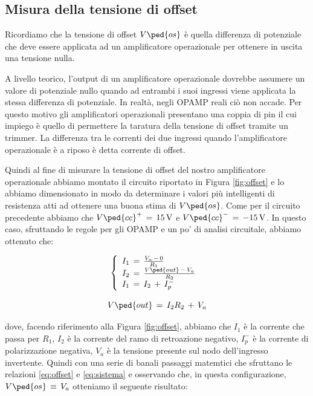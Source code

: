 \subsection*{Misura della tensione di offset}

Ricordiamo che la tensione di offset $V\ped{os}$ è quella differenza di potenziale che deve essere applicata ad un amplificatore operazionale per ottenere in uscita una tensione nulla.

A livello teorico, l'output di un amplificatore operazionale dovrebbe assumere un valore di potenziale nullo quando ad entrambi i suoi ingressi viene applicata la stessa differenza di potenziale. In realtà, negli OPAMP reali ciò non accade. Per questo motivo gli amplificatori operazionali presentano una coppia di pin il cui impiego è quello di permettere la taratura della tensione di offset tramite un trimmer. La differenza tra le correnti dei due ingressi quando l'amplificatore operazionale è a riposo è detta corrente di offset.

Quindi al fine di misurare la tensione di offset del nostro amplificatore operazionale abbiamo montato il circuito riportato in Figura \ref{fig:offset} e lo abbiamo dimensionato in modo da determinare i valori più intelligenti di resistenza atti ad ottenere una buona stima di $V\ped{os}$.
Come per il circuito precedente abbiamo che $V\ped{cc}^+\,=\,\SI{+15}{\volt}$ e $V\ped{cc}^-\,=\,\SI{-15}{\volt}$.
In questo caso, sfruttando le regole per gli OPAMP e un po' di analisi circuitale, abbiamo ottenuto che:

\begin{equation}
	\left\{
  \begin{array}{l l l}
    I_1\,=\,\frac{V_a\,-\,0}{R_1}\\
    I_2\,=\,\frac{V\ped{out}\,-\,V_a}{R_2}\\
    I_1\,=\,I_2\,+\,I_{p}^-
  \end{array} \right.\
  \label{eq:sistema}
\end{equation}

\begin{equation}
	V\ped{out}\,=\,I_2R_2\,+\,V_a
	\label{eq:offset}
\end{equation}

dove, facendo riferimento alla Figura \ref{fig:offset}, abbiamo che $I_1$ è la corrente che passa per $R_1$, $I_2$ è la corrente del ramo di retroazione negativo, $I_{p}^-$ è la corrente di polarizzazione negativa, $V_a$ è la tensione presente sul nodo dell'ingresso invertente.
Quindi con una serie di banali passaggi matemtici che sfruttano le relazioni \ref{eq:offset} e \ref{eq:sistema} e osservando che, in questa configurazione, $V\ped{os}\,\equiv\,V_a$ otteniamo il seguente risultato:

